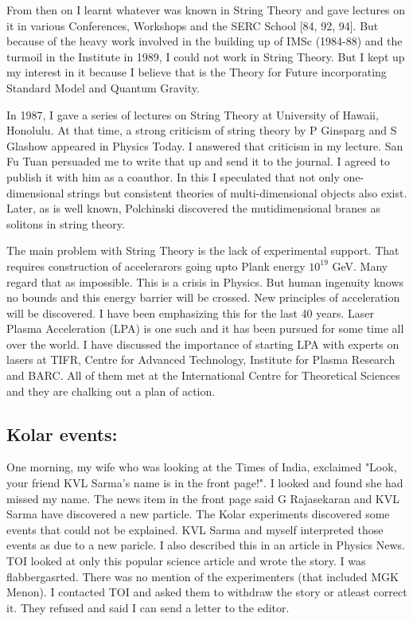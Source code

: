 From then on I learnt whatever was known in String Theory and gave 
lectures on it in various Conferences, Workshops and the SERC School 
[84, 92, 94]. But because of the heavy work involved in the building up of 
IMSc (1984-88) and the turmoil in the Institute in 1989, I could not 
work in String Theory. But I kept up my interest in it because I believe 
that is the Theory for Future incorporating Standard Model and Quantum 
Gravity.

In 1987, I gave a series of lectures on String Theory at University of 
Hawaii, Honolulu. At that time, a strong criticism of string theory by P 
Ginsparg and S Glashow appeared in Physics Today. I answered that 
criticism in my lecture. San Fu Tuan persuaded me to write that up and 
send it to the journal. I agreed to publish it with him as a coauthor. 
In this I speculated that not only one-dimensional strings but 
consistent theories of multi-dimensional objects also exist. Later, as 
is well known, Polchinski discovered the mutidimensional branes as 
solitons in string theory.

The main problem with String Theory is the lack of experimental support. 
That requires construction of accelerarors going upto Plank energy $10^{19}$ 
GeV. Many regard that as impossible. This is a crisis in Physics. But 
human ingenuity knows no bounds and this energy barrier will be crossed. 
New principles of acceleration will be discovered. I have been 
emphasizing this for the last 40 years. Laser Plasma Acceleration (LPA) 
is one such and it has been pursued for some time all over the world. I 
have discussed the importance of starting LPA with experts on lasers at 
TIFR, Centre for Advanced Technology, Institute for Plasma Research and 
BARC. All of them met at the International Centre for Theoretical 
Sciences and they are chalking out a plan of action.

\subsection*{Kolar events:}

One morning, my wife who was looking at the Times of India, exclaimed 
"Look, your friend KVL Sarma's name is in the front page!". I looked and 
found she had missed my name. The news item in the front page said G 
Rajasekaran and KVL Sarma have discovered a new particle. The Kolar 
experiments discovered some events that could not be explained. KVL 
Sarma and myself interpreted those events as due to a new paricle. I 
also described this in an article in Physics News. TOI looked at only 
this popular science article and wrote the story. I was flabbergasrted. 
There was no mention of the experimenters (that included MGK Menon). I 
contacted TOI and asked them to withdraw the story or atleast correct 
it. They refused and said I can send a letter to the editor.

